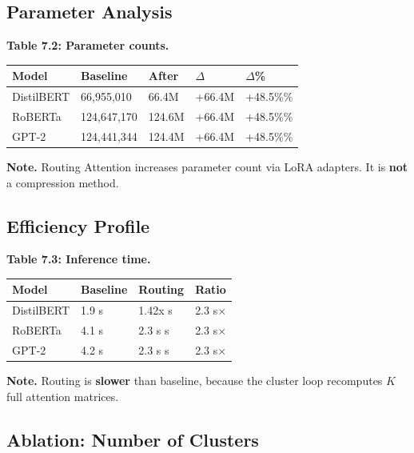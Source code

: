 \subsection{Parameter Analysis}

\textbf{Table 7.2: Parameter counts.}

\begin{table}[H]
\centering
\small
\begin{tabular}{lllll}
\toprule
\textbf{Model} & \textbf{Baseline} & \textbf{After} & \textbf{$\Delta$} & \textbf{$\Delta$\%} \\
\midrule
DistilBERT & 66,955,010 & 66.4M & +66.4M & +48.5\%\% \\
RoBERTa & 124,647,170 & 124.6M & +66.4M & +48.5\%\% \\
GPT-2 & 124,441,344 & 124.4M & +66.4M & +48.5\%\% \\
\bottomrule
\end{tabular}
\end{table}

\textbf{Note.} Routing Attention increases parameter count via LoRA adapters. 
It is \textbf{not} a compression method.

\subsection{Efficiency Profile}

\textbf{Table 7.3: Inference time.}

\begin{table}[H]
\centering
\small
\begin{tabular}{llll}
\toprule
\textbf{Model} & \textbf{Baseline} & \textbf{Routing} & \textbf{Ratio} \\
\midrule
DistilBERT & 1.9 s & 1.42x s & 2.3 s$\times$ \\
RoBERTa & 4.1 s & 2.3 s s & 2.3 s$\times$ \\
GPT-2 & 4.2 s & 2.3 s s & 2.3 s$\times$ \\
\bottomrule
\end{tabular}
\end{table}

\textbf{Note.} Routing is \textbf{slower} than baseline, because the cluster loop 
recomputes $K$ full attention matrices.

\subsection{Ablation: Number of Clusters}

